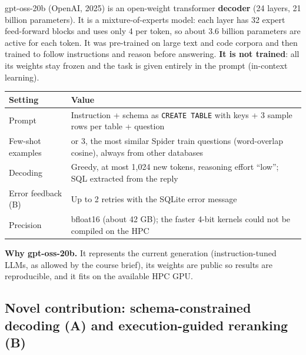 \documentclass[
  10pt,
]{article}
\newcounter{none} %
\begin{document}
gpt-oss-20b (OpenAI, 2025) is an open-weight transformer
\textbf{decoder} (24 layers, 21 billion parameters). It is a
mixture-of-experts model: each layer has 32 expert feed-forward blocks
and uses only 4 per token, so about 3.6 billion parameters are active
for each token. It was pre-trained on large text and code corpora and
then trained to follow instructions and reason before answering.
\textbf{It is not trained}: all its weights stay frozen and the task is
given entirely in the prompt (in-context learning).

{\def\LTcaptype{none} %
\begin{longtable}[]{@{}
  >{\raggedright\arraybackslash}p{}
  >{\raggedright\arraybackslash}p{}@{}}
\toprule\noalign{}
\begin{minipage}[b]{\linewidth}\raggedright
Setting
\end{minipage} & \begin{minipage}[b]{\linewidth}\raggedright
Value
\end{minipage} \\
\midrule\noalign{}
\endhead
\bottomrule\noalign{}
\endlastfoot
Prompt & Instruction + schema as \texttt{CREATE\ TABLE} with keys + 3
sample rows per table + question \\
Few-shot examples & 0 or 3, the most similar Spider train questions
(word-overlap cosine), always from other databases \\
Decoding & Greedy, at most 1,024 new tokens, reasoning effort ``low'';
SQL extracted from the reply \\
Error feedback (B) & Up to 2 retries with the SQLite error message \\
Precision & bfloat16 (about 42 GB); the faster 4-bit kernels could not
be compiled on the HPC \\
\end{longtable}
}

\textbf{Why gpt-oss-20b.} It represents the current generation
(instruction-tuned LLMs, as allowed by the course brief), its weights
are public so results are reproducible, and it fits on the available HPC
GPU.

\subsection{Novel contribution: schema-constrained decoding (A) and
execution-guided reranking
(B)}\label{novel-contribution-schema-constrained-decoding-a-and-execution-guided-reranking-b}
\end{document}
